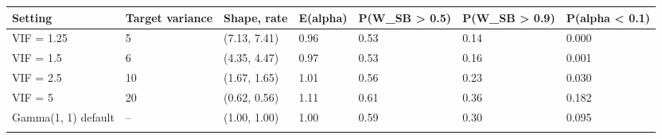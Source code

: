 \begin{longtable}{lllllll}
\toprule
Setting & Target variance & Shape, rate & E(alpha) & P(W\_SB > 0.5) & P(W\_SB > 0.9) & P(alpha < 0.1) \\
\midrule\endhead
VIF = 1.25 & 5 & (7.13, 7.41) & 0.96 & 0.53 & 0.14 & 0.000 \\ \addlinespace[3pt]
VIF = 1.5 & 6 & (4.35, 4.47) & 0.97 & 0.53 & 0.16 & 0.001 \\ \addlinespace[3pt]
VIF = 2.5 & 10 & (1.67, 1.65) & 1.01 & 0.56 & 0.23 & 0.030 \\ \addlinespace[3pt]
VIF = 5 & 20 & (0.62, 0.56) & 1.11 & 0.61 & 0.36 & 0.182 \\ \addlinespace[3pt]
Gamma(1, 1) default & -- & (1.00, 1.00) & 1.00 & 0.59 & 0.30 & 0.095 \\ \addlinespace[3pt]
\bottomrule\end{longtable}
